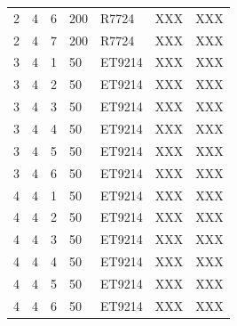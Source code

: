 \documentclass[3p,final,twocolumn]{elsarticle}
\begin{document}
\begin{table}[ht]
\begin{tabular}{  m{3em} | m{3em} | m{5em} | m{3em} | m{3em} | m{3em} | m{8em} }
2	&4	&6	&200	&R7724	&XXX	&XXX\\ 
2	&4	&7	&200	&R7724	&XXX	&XXX\\ 
3	&4	&1	&50	&ET9214	&XXX	&XXX\\ 
3	&4	&2	&50	&ET9214	&XXX	&XXX\\ 
3	&4	&3	&50	&ET9214	&XXX	&XXX\\ 
3	&4	&4	&50	&ET9214	&XXX	&XXX\\ 
3	&4	&5	&50	&ET9214	&XXX	&XXX\\ 
3	&4	&6	&50	&ET9214	&XXX	&XXX\\ 
4	&4	&1	&50	&ET9214	&XXX	&XXX\\ 
4	&4	&2	&50	&ET9214	&XXX	&XXX\\ 
4	&4	&3	&50	&ET9214	&XXX	&XXX\\ 
4	&4	&4	&50	&ET9214	&XXX	&XXX\\ 
4	&4	&5	&50	&ET9214	&XXX	&XXX\\ 
4	&4	&6	&50	&ET9214	&XXX	&XXX\\ 
		\hline
	\end{tabular}
\end{table}
\end{document}
